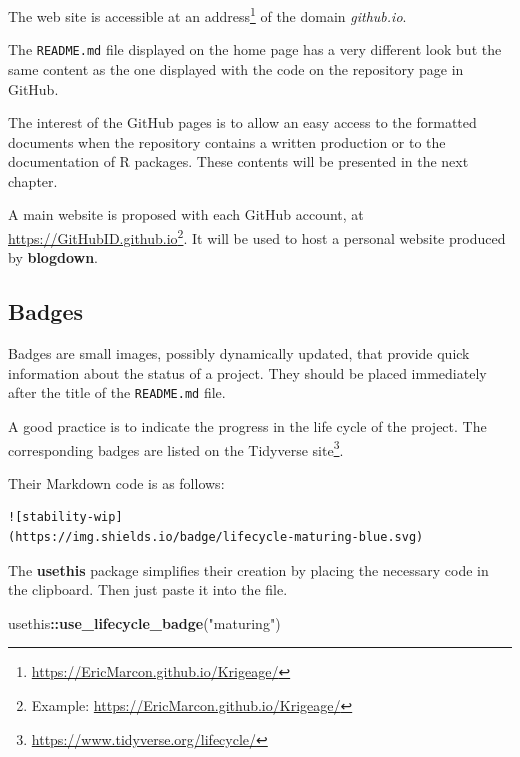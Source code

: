 \documentclass[
  12pt,
  american,
  a4paper,
  extrafontsizes,onecolumn,openright
  ]{memoir}
\newenvironment{Shaded}{\begin{snugshade}}{\end{snugshade}}
\newcommand{\FunctionTok}[1]{\textcolor[rgb]{0.13,0.29,0.53}{\textbf{#1}}}
\newcommand{\NormalTok}[1]{#1}
\newcommand{\SpecialCharTok}[1]{\textcolor[rgb]{0.81,0.36,0.00}{\textbf{#1}}}
\newcommand{\StringTok}[1]{\textcolor[rgb]{0.31,0.60,0.02}{#1}}
\begin{document}
The web site is accessible at an address\footnote{\url{https://EricMarcon.github.io/Krigeage/}} of the domain \emph{github.io}.

The \texttt{README.md} file displayed on the home page has a very different look but the same content as the one displayed with the code on the repository page in GitHub.

The interest of the GitHub pages is to allow an easy access to the formatted documents when the repository contains a written production or to the documentation of R packages.
These contents will be presented in the next chapter.

A main website is proposed with each GitHub account, at \url{https://GitHubID.github.io}\footnote{Example: \url{https://EricMarcon.github.io/Krigeage/}}.
It will be used to host a personal website produced by \textbf{blogdown}.

\subsection{Badges}\label{badges}

Badges are small images, possibly dynamically updated, that provide quick information about the status of a project.
They should be placed immediately after the title of the \texttt{README.md} file.

A good practice is to indicate the progress in the life cycle of the project.
The corresponding badges are listed on the Tidyverse site\footnote{\url{https://www.tidyverse.org/lifecycle/}}.

Their Markdown code is as follows:

\begin{verbatim}
![stability-wip]
(https://img.shields.io/badge/lifecycle-maturing-blue.svg)
\end{verbatim}

The \textbf{usethis} package simplifies their creation by placing the necessary code in the clipboard.
Then just paste it into the file.

\scriptsize

\begin{Shaded}
\begin{Highlighting}[]
\NormalTok{usethis}\SpecialCharTok{::}\FunctionTok{use\_lifecycle\_badge}\NormalTok{(}\StringTok{"maturing"}\NormalTok{)}
\end{Highlighting}
\end{Shaded}

\normalsize
\end{document}
